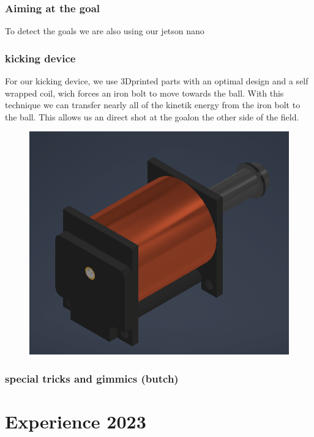 \documentclass{scrartcl}
\begin{document}
 \subsubsection{Aiming at the goal}
 To detect the goals we are also using our jetson nano 
 \subsubsection{kicking device}
For our kicking device, we use 3Dprinted parts with an optimal design and a self wrapped coil, wich forces an iron bolt to move towards the ball.
With this technique we can transfer nearly all of the kinetik energy from the iron bolt to the ball. This allows us an direct
shot at the goalon the other side of the field. 
\begin{figure}[h]
    \centering
    \includegraphics[width=\textwidth]{img/Schuss.png}
    \caption{}
    \label{fig:kicking device}
\end{figure}

 \subsubsection{special tricks and gimmics (butch)}

 
 \section{Experience 2023}
 
\end{document}
